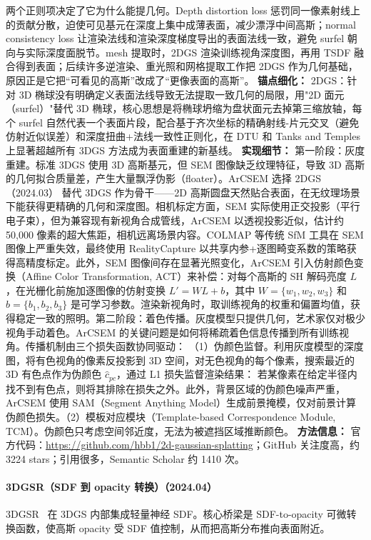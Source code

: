 两个正则项决定了它为什么能提几何。Depth distortion loss 惩罚同一像素射线上的贡献分散，迫使可见基元在深度上集中成薄表面，减少漂浮中间高斯；normal consistency loss 让渲染法线和渲染深度梯度导出的表面法线一致，避免 surfel 朝向与实际深度面脱节。mesh 提取时，2DGS 渲染训练视角深度图，再用 TSDF 融合得到表面；后续许多逆渲染、重光照和网格提取工作把 2DGS 作为几何基础，原因正是它把“可看见的高斯”改成了“更像表面的高斯”。
\textbf{锚点细化：} 2DGS：针对 3D 椭球没有明确定义表面法线导致无法提取一致几何的局限，用"2D 面元（surfel）"替代 3D 椭球，核心思想是将椭球坍缩为盘状面元去掉第三缩放轴，每个 surfel 自然代表一个表面片段，配合基于齐次坐标的精确射线-片元交叉（避免仿射近似误差）和深度扭曲+法线一致性正则化，在 DTU 和 Tanks and Temples 上显著超越所有 3DGS 方法成为表面重建的新基线。
\textbf{实现细节：} 第一阶段：灰度重建。标准 3DGS 使用 3D 高斯基元，但 SEM 图像缺乏纹理特征，导致 3D 高斯的几何拟合质量差，产生大量飘浮伪影（floater）。ArCSEM 选择 2DGS（2024.03） 替代 3DGS 作为骨干——2D 高斯圆盘天然贴合表面，在无纹理场景下能获得更精确的几何和深度图。相机标定方面，SEM 实际使用正交投影（平行电子束），但为兼容现有新视角合成管线，ArCSEM 以透视投影近似，估计约 50,000 像素的超大焦距，相机远离场景内容。COLMAP 等传统 SfM 工具在 SEM 图像上严重失效，最终使用 RealityCapture 以共享内参+逐图畸变系数的策略获得高精度标定。此外，SEM 图像间存在显著光照变化，ArCSEM 引入仿射颜色变换（Affine Color Transformation, ACT）来补偿：对每个高斯的 SH 解码亮度 $L$，在光栅化前施加逐图像的仿射变换 $L' = WL + b$，其中 $W = \{w_1, w_2, w_3\}$ 和 $b = \{b_1, b_2, b_3\}$ 是可学习参数。渲染新视角时，取训练视角的权重和偏置均值，获得稳定一致的照明。第二阶段：着色传播。灰度模型只提供几何，艺术家仅对极少视角手动着色。ArCSEM 的关键问题是如何将稀疏着色信息传播到所有训练视角。传播机制由三个损失函数协同驱动： （1）伪颜色监督。利用灰度模型的深度图，将有色视角的像素反投影到 3D 空间，对无色视角的每个像素，搜索最近的 3D 有色点作为伪颜色 $\hat{c}_{pc}$，通过 L1 损失监督渲染结果： 若某像素在给定半径内找不到有色点，则将其排除在损失之外。此外，背景区域的伪颜色噪声严重，ArCSEM 使用 SAM（Segment Anything Model）生成前景掩模，仅对前景计算伪颜色损失。（2）模板对应模块（Template-based Correspondence Module, TCM）。伪颜色只考虑空间邻近度，无法为被遮挡区域推断颜色。
\textbf{方法信息：} 官方代码：\url{https://github.com/hbb1/2d-gaussian-splatting}；GitHub 关注度高，约 3224 stars；引用很多，Semantic Scholar 约 1410 次。



\paragraph{3DGSR（SDF 到 opacity 转换）（2024.04）}
3DGSR~\cite{2404_00409} 在 3DGS 内部集成轻量神经 SDF。核心桥梁是 SDF-to-opacity 可微转换函数，使高斯 opacity 受 SDF 值控制，从而把高斯分布推向表面附近。

